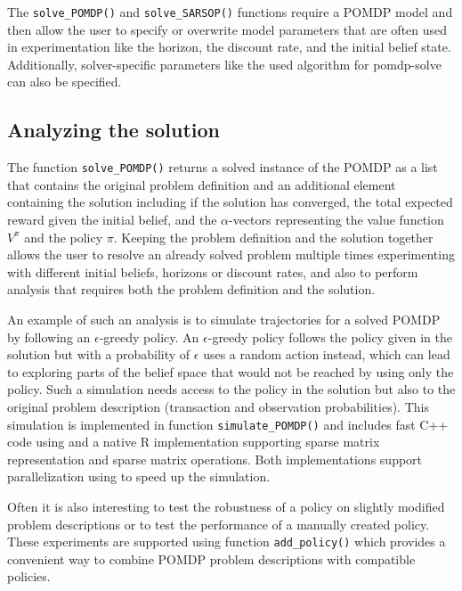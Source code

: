 The \texttt{solve\_POMDP()} and \texttt{solve\_SARSOP()} functions require a POMDP model and then
allow the user to specify or overwrite model parameters that are often used in experimentation
like the horizon, the discount rate, and the initial belief state. Additionally, solver-specific parameters
like the used algorithm for pomdp-solve can also be specified.

\subsection{Analyzing the solution}\label{analyzing-the-solution}

The function \texttt{solve\_POMDP()} returns a solved instance of the POMDP as a list that contains the original
problem definition and an additional element
containing the solution including if the solution has converged, the total expected reward given the initial belief, and the \(\alpha\)-vectors representing the value function \(V^\pi\) and the policy \(\pi\).
Keeping the problem definition and the solution together allows the user to
resolve an already solved problem multiple times experimenting with different initial beliefs, horizons or
discount rates,
and also to perform
analysis that requires both the problem definition and the solution.

An example of such an analysis is to simulate trajectories for a solved POMDP by following
an \(\epsilon\)-greedy policy.
An \(\epsilon\)-greedy policy follows the policy given in the solution but with a probability of \(\epsilon\) uses a random action instead,
which can lead to exploring parts of the belief space that would not be reached by using only the policy.
Such a simulation needs access to the policy in the solution but also to the original problem description
(transaction and observation probabilities). This simulation is implemented in function \texttt{simulate\_POMDP()}
and includes fast C++ code using  \citep{Eddelbuettel2013} and a native R implementation supporting
sparse matrix representation and sparse matrix operations.
Both implementations support parallelization using  \citep{Microsoft2022}
to speed up the simulation.

Often it is also interesting to test the robustness
of a policy on slightly modified problem descriptions or to test
the performance of a manually created policy. These experiments are supported
using function \texttt{add\_policy()} which provides a convenient way to combine POMDP problem descriptions with compatible policies.

